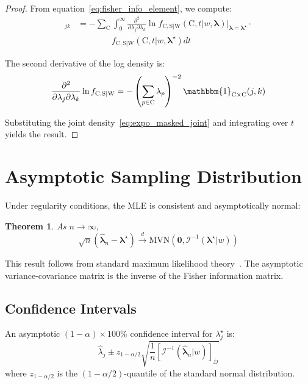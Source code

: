 \documentclass[12pt]{article}
\newcommand{\RV}[1]{\mathrm{#1}}
\newcommand{\sv}{\RV{S}}           %
\newcommand{\cand}{\RV{C}}         %
\newcommand{\rvcand}{\RV{C}}       %
\newcommand{\tparam}[1]{{#1}^{\star}}  %
\newcommand{\estimator}[1]{\hat{#1}}   %
\newcommand{\expomle}{\boldsymbol{\hat{\lambda}}_n}
\newcommand{\infomatrx}{\mathcal{I}}
\newcommand{\pdf}{f}
\newcommand{\mvn}{\mathrm{MVN}}
\renewcommand{\vec}[1]{\boldsymbol{#1}}
\newtheorem{theorem}{Theorem}[section]
\theoremstyle{definition}
\begin{document}
\begin{proof}
From equation~\eqref{eq:fisher_info_element}, we compute:
\begin{align}
[\infomatrx(\tparam{\vec{\lambda}} | w)]_{jk} &= -\sum_{\cand} \int_0^\infty \frac{\partial^2}{\partial \lambda_j \partial \lambda_k} \ln \pdf_{\rvcand, \sv | \RV{W}}(\cand, t | w, \vec{\lambda})\Big|_{\vec{\lambda}=\tparam{\vec{\lambda}}} \cdot\\
&\qquad\qquad \pdf_{\rvcand, \sv | \RV{W}}(\cand, t | w, \tparam{\vec{\lambda}}) dt
\end{align}

The second derivative of the log density is:
\begin{equation}
\frac{\partial^2}{\partial \lambda_j \partial \lambda_k} \ln \pdf_{\rvcand, \sv | \RV{W}} = -\left(\sum_{p \in \cand} \lambda_p\right)^{-2} \mathbbm{1}_{\cand \times \cand}(j,k)
\end{equation}

Substituting the joint density~\eqref{eq:expo_masked_joint} and integrating over $t$ yields the result.
\end{proof}

\section{Asymptotic Sampling Distribution}

Under regularity conditions, the MLE is consistent and asymptotically normal:

\begin{theorem}
\label{thm:asymptotic_normal}
As $n \to \infty$,
\begin{equation}
\sqrt{n}(\expomle - \tparam{\vec{\lambda}}) \xrightarrow{d} \mvn\left(\vec{0}, \infomatrx^{-1}(\tparam{\vec{\lambda}} | w)\right)
\end{equation}
\end{theorem}

This result follows from standard maximum likelihood theory~\cite{bickel}. The asymptotic variance-covariance matrix is the inverse of the Fisher information matrix.

\subsection{Confidence Intervals}

An asymptotic $(1-\alpha) \times 100\%$ confidence interval for $\tparam{\lambda}_j$ is:
\begin{equation}
\label{eq:confidence_interval}
\estimator{\lambda}_j \pm z_{1-\alpha/2} \sqrt{\frac{1}{n} [\infomatrx^{-1}(\expomle | w)]_{jj}}
\end{equation}
where $z_{1-\alpha/2}$ is the $(1-\alpha/2)$-quantile of the standard normal distribution.
\end{document}
